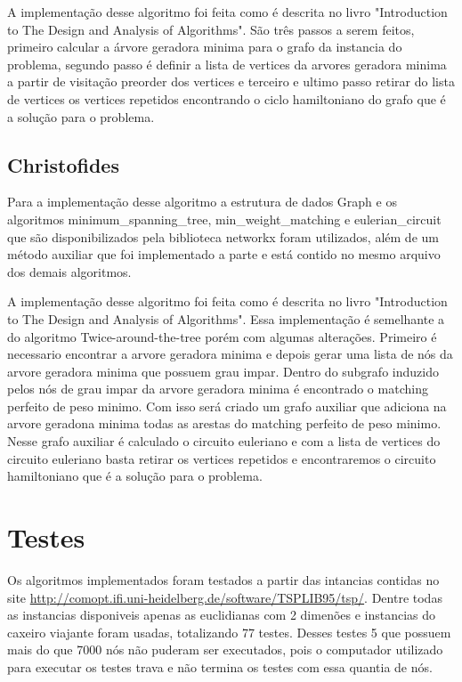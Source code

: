 \documentclass[12pt]{article}
\begin{document}
A implementação desse algoritmo foi feita como é descrita no livro "Introduction to The Design and Analysis of Algorithms". São três passos a serem feitos, primeiro calcular a árvore geradora minima para o grafo da instancia do problema, segundo passo é definir a lista de vertices da arvores geradora minima a partir de visitação preorder dos vertices e terceiro e ultimo passo retirar do lista de vertices os vertices repetidos encontrando o ciclo hamiltoniano do grafo que é a solução para o problema.

\subsection{Christofides}

Para a implementação desse algoritmo a estrutura de dados Graph e os algoritmos minimum\_spanning\_tree, min\_weight\_matching e eulerian\_circuit que são disponibilizados pela biblioteca networkx foram utilizados, além de um método auxiliar que foi implementado a parte e está contido no mesmo arquivo dos demais algoritmos.

A implementação desse algoritmo foi feita como é descrita no livro "Introduction to The Design and Analysis of Algorithms". Essa implementação é semelhante a do algoritmo Twice-around-the-tree porém com algumas alterações. Primeiro é necessario encontrar a arvore geradora minima e depois gerar uma lista de nós da arvore geradora minima que possuem grau impar. Dentro do subgrafo induzido pelos nós de grau impar da arvore geradora minima é encontrado o matching perfeito de peso minimo. Com isso será criado um grafo auxiliar que adiciona na arvore geradona minima todas as arestas do matching perfeito de peso minimo. Nesse grafo auxiliar é calculado o circuito euleriano e com a lista de vertices do circuito euleriano basta retirar os vertices repetidos e encontraremos o circuito hamiltoniano que é a solução para o problema.

\section{Testes}

Os algoritmos implementados foram testados a partir das intancias contidas no site \url{http://comopt.ifi.uni-heidelberg.de/software/TSPLIB95/tsp/}. Dentre todas as instancias disponiveis apenas as euclidianas com 2 dimenões e instancias do caxeiro viajante foram usadas, totalizando 77 testes. Desses testes 5 que possuem mais do que 7000 nós não puderam ser executados, pois o computador utilizado para executar os testes trava e não termina os testes com essa quantia de nós.
\end{document}
